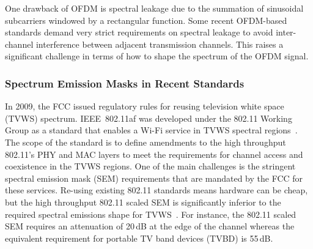 One drawback of OFDM is spectral leakage due to the summation of sinusoidal subcarriers windowed by a rectangular function.
Some recent OFDM-based standards demand very strict requirements on spectral leakage to avoid inter-channel interference between adjacent transmission channels.
This raises a significant challenge in terms of how to shape the spectrum of the OFDM signal.

\subsubsection{Spectrum Emission Masks in Recent Standards}
In 2009, the FCC issued regulatory rules for reusing television white space (TVWS) spectrum.
IEEE~802.11af was developed under the 802.11 Working Group as a standard that enables a Wi-Fi service in TVWS spectral regions~\cite{802-11af2013}.
The scope of the standard is to define amendments to the high throughput 802.11's PHY and MAC layers to meet the requirements for channel access and coexistence in the TVWS regions.
One of the main challenges is the stringent spectral emission mask (SEM) requirements that are mandated by the FCC for these services.
Re-using existing 802.11 standards means hardware can be cheap, but the high throughput 802.11 scaled SEM is significantly inferior to the required spectral emissions shape for TVWS~\cite{Shellhammer2009}.
For instance, the 802.11 scaled SEM requires an attenuation of 20\,dB at the edge of the channel whereas the equivalent requirement for portable TV band devices (TVBD) is 55\,dB.

